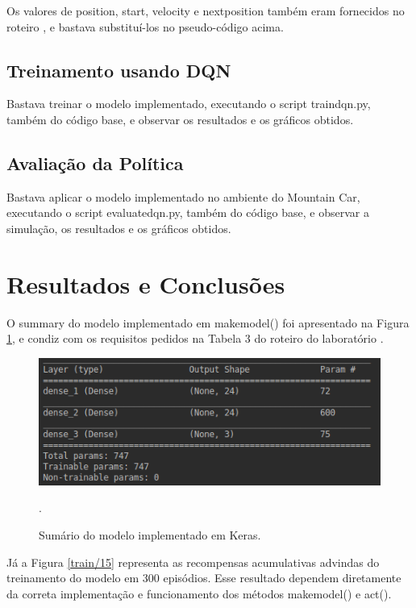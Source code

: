 \documentclass[conference]{IEEEtran}
\begin{document}
	Os valores de position, start, velocity e next\underline{\space}position também eram fornecidos no roteiro \cite{roteiro}, e bastava substituí-los no pseudo-código acima.

	\subsection{Treinamento usando DQN}
	
	Bastava treinar o modelo implementado, executando o script train\underline{\space}dqn.py, também do código base, e observar os resultados e os gráficos obtidos.

	\subsection{Avaliação da Política}
	
	Bastava aplicar o modelo implementado no ambiente do Mountain Car, executando o script evaluate\underline{\space}dqn.py, também do código base, e observar a simulação, os resultados e os gráficos obtidos.

\section{Resultados e Conclusões} \label{results}

	O summary do modelo implementado em make\underline{\space}model() foi apresentado na Figura \ref{summary}, e condiz com os requisitos pedidos na Tabela 3 do roteiro do laboratório \cite{roteiro}. 

\begin{figure}[htbp]
\centering
\centerline{\includegraphics[scale=0.5]{imagens/summary.png}}
\caption{Sumário do modelo implementado em Keras.}.
\label{summary}
\end{figure}

	Já a Figura \ref{train/15} representa as recompensas acumulativas advindas do treinamento do modelo em 300 episódios. Esse resultado dependem diretamente da correta implementação e funcionamento dos métodos make\underline{\space}model() e act().
	
\end{document}

